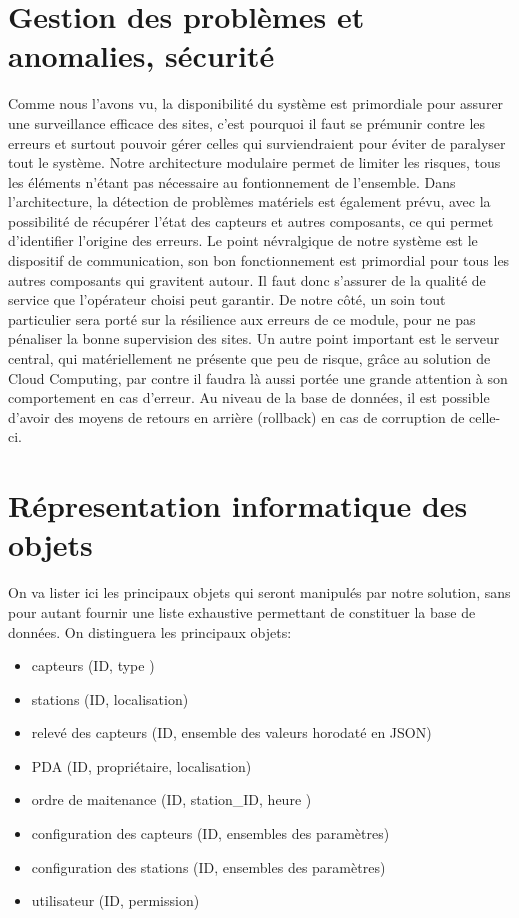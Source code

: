 \section{Gestion des problèmes et anomalies, sécurité}

Comme nous l'avons vu, la disponibilité du système est primordiale pour assurer une surveillance efficace des sites, c'est pourquoi il faut se prémunir contre les erreurs et surtout pouvoir gérer celles qui surviendraient pour éviter de paralyser tout le système. Notre architecture modulaire permet de limiter les risques, tous les éléments n'étant pas nécessaire au fontionnement de l'ensemble.
Dans l'architecture, la détection de problèmes matériels est également prévu, avec la possibilité de récupérer l'état des capteurs et autres composants, ce qui permet d'identifier l'origine des erreurs.
Le point névralgique de notre système est le dispositif de communication, son bon fonctionnement est primordial pour tous les autres composants qui gravitent autour. Il faut donc s'assurer de la qualité de service que l'opérateur choisi peut garantir. De notre côté, un soin tout particulier sera porté sur la résilience aux erreurs de ce module, pour ne pas pénaliser la bonne supervision des sites.
Un autre point important est le serveur central, qui matériellement ne présente que peu de risque, grâce au solution de Cloud Computing, par contre il faudra là aussi portée une grande attention à son comportement en cas d'erreur. Au niveau de la base de données, il est possible d'avoir des moyens de retours en arrière (rollback) en cas de corruption de celle-ci.

\newpage
\appendix
\appendixpage

\section{Répresentation informatique des objets}
	
On va lister ici les principaux objets qui seront manipulés par notre solution, sans pour autant fournir une liste exhaustive permettant de constituer la base de données.
On distinguera les principaux objets:

\begin{itemize}
\item capteurs (ID, type )
\item stations (ID, localisation)	
\item relevé des capteurs (ID, ensemble des valeurs horodaté en JSON)
\item PDA (ID, propriétaire, localisation)
\item ordre de maitenance (ID, station_ID, heure )
\item configuration des capteurs (ID, ensembles des paramètres)
\item configuration des stations (ID, ensembles des paramètres)
\item utilisateur (ID, permission)
\end{itemize}

